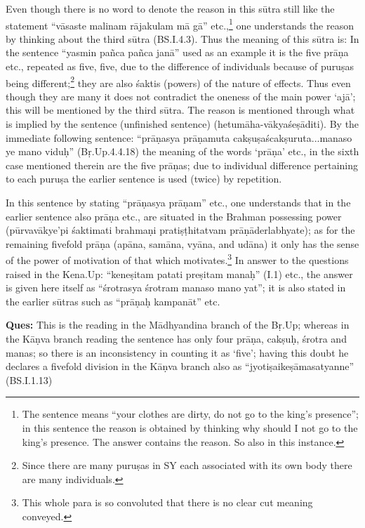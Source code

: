 Even though there is no word to denote the reason in this sūtra still like the statement “vāsaste malinam rājakulam mā gā” etc.,\footnote{The sentence means “your clothes are dirty, do not go to the king’s presence”; in this sentence the reason is obtained by thinking why should I not go to the king’s presence. The answer contains the reason. So also in this instance.} one understands the reason by thinking about the third sūtra (BS.I.4.3). Thus the meaning of this sūtra is: In the sentence “yasmin pañca pañca janā” used as an example it is the five prāṇa etc., repeated as five, five, due to the difference of individuals because of puruṣas being different;\footnote{Since there are many puruṣas in SY each associated with its own body there are many individuals.} they are also śaktis (powers) of the nature of effects. Thus even though they are many it does not contradict the oneness of the main power ‘ajā’; this will be mentioned by the third sūtra. The reason is mentioned through what is implied by the sentence  (unfinished sentence) (hetumāha-vākyaśeṣāditi). By the immediate following sentence: “prāṇasya prāṇamuta cakṣuṣaścakṣuruta...manaso ye mano viduḥ” (Bṛ.Up.4.4.18) the meaning of the words ‘prāṇa’ etc., in the sixth case mentioned therein are the five prāṇas; due to  individual difference pertaining to each puruṣa the earlier sentence is used (twice) by repetition.

In this sentence by stating “prāṇasya prāṇam” etc., one understands that in the earlier sentence also prāṇa etc., are situated in the Brahman possessing power (pūrvavākye’pi śaktimati brahmaṇi pratiṣṭhitatvam prāṇāderlabhyate); as for the remaining fivefold prāṇa (apāna, samāna, vyāna, and udāna) it only has the sense of the power of motivation of that which motivates.\footnote{This whole para is so convoluted that there is no clear cut meaning conveyed.} In answer to the questions raised in the Kena.Up: “keneṣitam patati preṣitam manaḥ” (I.1) etc.,  the answer is given here itself as “śrotrasya śrotram manaso mano yat”; it is also stated in the earlier sūtras such as “prāṇaḥ kampanāt” etc. 

\textbf{Ques:} This is the reading in the Mādhyandina branch of the Bṛ.Up; whereas in the  Kāṇva branch reading the sentence has only four  prāṇa, cakṣuḥ, śrotra and manas; so there is an inconsistency in counting it as ‘five’;  having this doubt he declares a fivefold division in the Kāṇva branch also as “jyotiṣaikeṣāmasatyanne” (BS.I.1.13)

